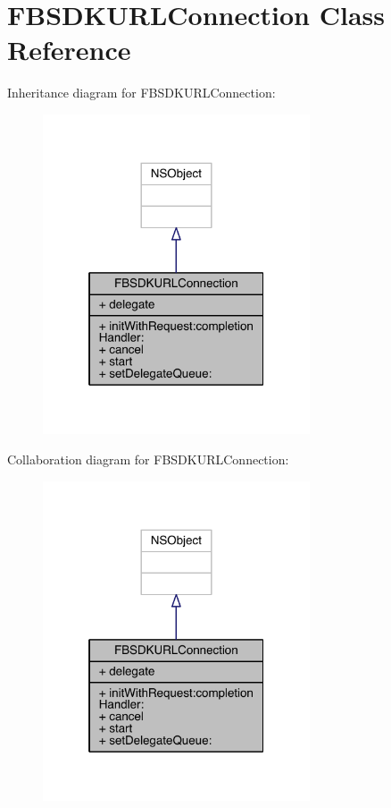 \hypertarget{interface_f_b_s_d_k_u_r_l_connection}{\section{F\-B\-S\-D\-K\-U\-R\-L\-Connection Class Reference}
\label{interface_f_b_s_d_k_u_r_l_connection}
}


Inheritance diagram for F\-B\-S\-D\-K\-U\-R\-L\-Connection\-:
\nopagebreak
\begin{figure}[H]
\begin{center}
\leavevmode
\includegraphics[width=224pt]{interface_f_b_s_d_k_u_r_l_connection__inherit__graph}
\end{center}
\end{figure}


Collaboration diagram for F\-B\-S\-D\-K\-U\-R\-L\-Connection\-:
\nopagebreak
\begin{figure}[H]
\begin{center}
\leavevmode
\includegraphics[width=224pt]{interface_f_b_s_d_k_u_r_l_connection__coll__graph}
\end{center}
\end{figure}

